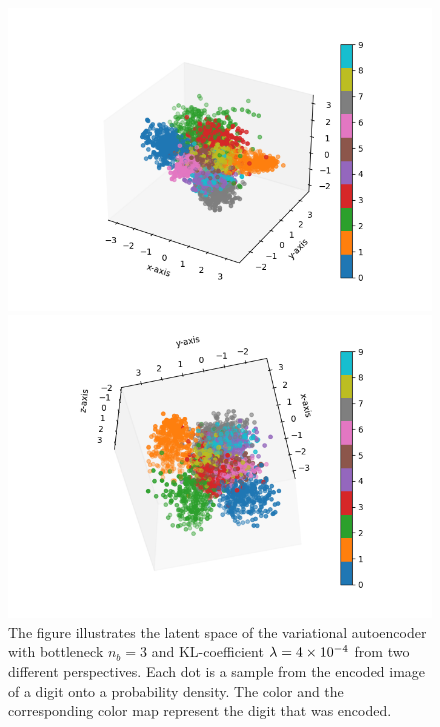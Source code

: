 \begin{figure}
\begin{center}
   \begin{minipage}[b]{0.49\linewidth}
      \includegraphics[trim = 20mm 10mm 20mm 10mm, clip, width=\linewidth]{convolutional_VAE_snd_KL_4e-4_5k_epochs_3D_latent_1}
	\end{minipage}
   \begin{minipage}[b]{0.49\linewidth}
      \includegraphics[trim = 20mm 10mm 20mm 10mm, clip, width=\linewidth]{convolutional_VAE_snd_KL_4e-4_5k_epochs_3D_latent_2}
	\end{minipage}
\end{center}
\caption{The figure illustrates the latent space of the variational autoencoder with bottleneck $n_b=3$ and KL-coefficient $\lambda = \num{4e-4}$ from two different perspectives. Each dot is a sample from the encoded image of a digit onto a probability density. The color and the corresponding color map represent the digit that was encoded.}\label{fig:convolutional_VAE_snd_KL_4e-4_5k_epochs_3D_latent}
\end{figure}


